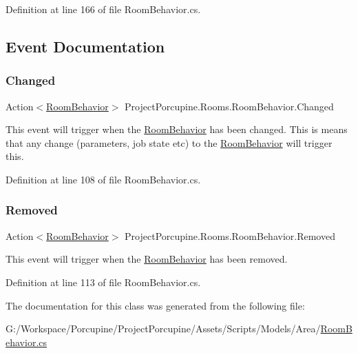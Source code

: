 Definition at line 166 of file Room\+Behavior.\+cs.



\subsection{Event Documentation}
\mbox{\label{class_project_porcupine_1_1_rooms_1_1_room_behavior_af53085bc4c6cc1c1ff3785dc318bccbc}} 
\subsubsection{\texorpdfstring{Changed}{Changed}}
{\footnotesize\ttfamily Action$<$\hyperlink{class_project_porcupine_1_1_rooms_1_1_room_behavior}{Room\+Behavior}$>$ Project\+Porcupine.\+Rooms.\+Room\+Behavior.\+Changed}



This event will trigger when the \hyperlink{class_project_porcupine_1_1_rooms_1_1_room_behavior}{Room\+Behavior} has been changed. This is means that any change (parameters, job state etc) to the \hyperlink{class_project_porcupine_1_1_rooms_1_1_room_behavior}{Room\+Behavior} will trigger this. 



Definition at line 108 of file Room\+Behavior.\+cs.

\mbox{\label{class_project_porcupine_1_1_rooms_1_1_room_behavior_ab49ba34c2107945554b224fe814cf212}} 
\subsubsection{\texorpdfstring{Removed}{Removed}}
{\footnotesize\ttfamily Action$<$\hyperlink{class_project_porcupine_1_1_rooms_1_1_room_behavior}{Room\+Behavior}$>$ Project\+Porcupine.\+Rooms.\+Room\+Behavior.\+Removed}



This event will trigger when the \hyperlink{class_project_porcupine_1_1_rooms_1_1_room_behavior}{Room\+Behavior} has been removed. 



Definition at line 113 of file Room\+Behavior.\+cs.



The documentation for this class was generated from the following file\+:\begin{DoxyCompactItemize}
\item 
G\+:/\+Workspace/\+Porcupine/\+Project\+Porcupine/\+Assets/\+Scripts/\+Models/\+Area/\hyperlink{_room_behavior_8cs}{Room\+Behavior.\+cs}\end{DoxyCompactItemize}

